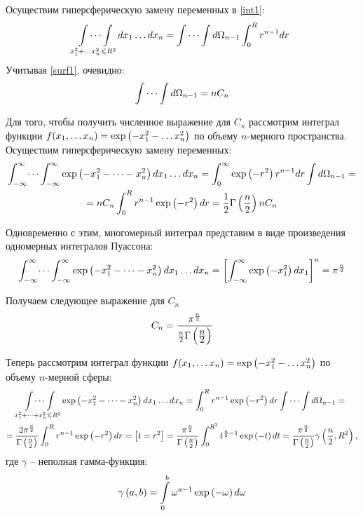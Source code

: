 Осуществим гиперсферическую замену переменных в \eqref{int1}:
\vverh
\begin{gather}
	\idotsint\limits_{x_1^2 + \dots x_n^2 \leqslant R^2} dx_1 \dots dx_n = \idotsint d \Omega_{n-1} \int_{0}^{R} r^{n-1} dr \notag
\end{gather}
Учитывая \eqref{surf1}, очевидно:
\vverh
\begin{gather}
	\idotsint d \Omega_{n-1} = n C_n \notag
\end{gather}

Для того, чтобы получить численное выражение для $C_n$ рассмотрим интеграл функции $f(x_1, \dots x_n) = \exp \left( -x_1^2 - \dots x_n^2 \right)$ по объему $n$-мерного пространства. Осуществим гиперсферическую замену переменных: 
\vverh
\begin{gather}
	\int_{-\infty}^{\infty} \dots \int_{-\infty}^{\infty} \exp \left( -x_1^2 - \dots -x_n^2 \right) dx_1 \dots dx_n = \int_{0}^{\infty} \exp \left( -r^2 \right) r^{n-1} dr \int d \Omega_{n-1}  = \notag \\
	= n C_n \int_{0}^{R} r^{n-1} \exp \left( -r^2 \right) dr = \frac{1}{2} \Gamma \left( \frac{n}{2} \right) n C_n \notag
\end{gather}

Одновременно с этим, многомерный интеграл представим в виде произведения одномерных интегралов Пуассона:
\vverh
\begin{gather}
	\int_{-\infty}^{\infty} \dots \int_{-\infty}^{\infty} \exp \left( -x_1^2 - \dots - x_n^2 \right) d x_1 \dots dx_n = \left[ \int_{-\infty}^{\infty} \exp \left( -x_1^2 \right) dx_1 \right]^n  = \pi^\frac{n}{2} \notag 
\end{gather}

Получаем следующее выражение для $C_n$ 
\vverh
\begin{gather}
	C_n = \frac{\pi^\frac{n}{2}}{\frac{n}{2} \Gamma \left( \frac{\displaystyle n}{\displaystyle 2} \right)} \notag
\end{gather}

Теперь рассмотрим интеграл функции $f(x_1, \dots x_n) = \exp \left( -x_1^2 - \dots x_n^2 \right)$ по объему $n$-мерной сферы:  
\begin{gather}
	\idotsint\limits_{x_1^2 + \dots + x_n^2 \leqslant R^2} \exp \left( -x_1^2 - \dots - x_n^2 \right) dx_1 \dots dx_n = \int_{0}^{R} r^{n-1} \exp \left( -r^2 \right) dr \idotsint d \Omega_{n-1} = \notag \\
	= \frac{2 \pi^{\frac{n}{2}}}{\Gamma \left( \frac{n}{2} \right)} \int_{0}^{R} r^{n-1} \exp \left( -r^2 \right) dr = \left[ t = r^2 \right] = \frac{\pi^{\frac{n}{2}}}{\Gamma \left( \frac{n}{2} \right)} \int_{0}^{R^2} t^{\frac{n}{2} - 1} \exp \left( -t \right) dt = \frac{\pi^{\frac{n}{2}}}{\Gamma \left( \frac{n}{2} \right)} \gamma \left( \frac{n}{2}, R^2 \right), \notag
\end{gather}
где $\gamma$ -- неполная гамма-функция:
\vverh
\begin{gather}
	\gamma \left( a, b \right) = \int\limits_{0}^{b} \omega^{a - 1} \exp \left( - \omega \right) d \omega \notag
\end{gather}



